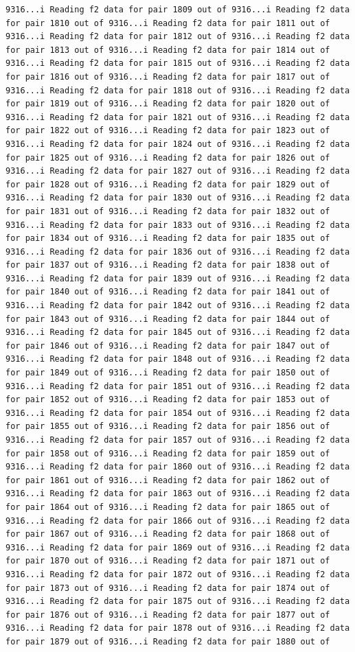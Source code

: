 \documentclass[
]{article}
\begin{document}
\begin{verbatim}
9316...i Reading f2 data for pair 1809 out of 9316...i Reading f2 data for pair 1810 out of 9316...i Reading f2 data for pair 1811 out of 9316...i Reading f2 data for pair 1812 out of 9316...i Reading f2 data for pair 1813 out of 9316...i Reading f2 data for pair 1814 out of 9316...i Reading f2 data for pair 1815 out of 9316...i Reading f2 data for pair 1816 out of 9316...i Reading f2 data for pair 1817 out of 9316...i Reading f2 data for pair 1818 out of 9316...i Reading f2 data for pair 1819 out of 9316...i Reading f2 data for pair 1820 out of 9316...i Reading f2 data for pair 1821 out of 9316...i Reading f2 data for pair 1822 out of 9316...i Reading f2 data for pair 1823 out of 9316...i Reading f2 data for pair 1824 out of 9316...i Reading f2 data for pair 1825 out of 9316...i Reading f2 data for pair 1826 out of 9316...i Reading f2 data for pair 1827 out of 9316...i Reading f2 data for pair 1828 out of 9316...i Reading f2 data for pair 1829 out of 9316...i Reading f2 data for pair 1830 out of 9316...i Reading f2 data for pair 1831 out of 9316...i Reading f2 data for pair 1832 out of 9316...i Reading f2 data for pair 1833 out of 9316...i Reading f2 data for pair 1834 out of 9316...i Reading f2 data for pair 1835 out of 9316...i Reading f2 data for pair 1836 out of 9316...i Reading f2 data for pair 1837 out of 9316...i Reading f2 data for pair 1838 out of 9316...i Reading f2 data for pair 1839 out of 9316...i Reading f2 data for pair 1840 out of 9316...i Reading f2 data for pair 1841 out of 9316...i Reading f2 data for pair 1842 out of 9316...i Reading f2 data for pair 1843 out of 9316...i Reading f2 data for pair 1844 out of 9316...i Reading f2 data for pair 1845 out of 9316...i Reading f2 data for pair 1846 out of 9316...i Reading f2 data for pair 1847 out of 9316...i Reading f2 data for pair 1848 out of 9316...i Reading f2 data for pair 1849 out of 9316...i Reading f2 data for pair 1850 out of 9316...i Reading f2 data for pair 1851 out of 9316...i Reading f2 data for pair 1852 out of 9316...i Reading f2 data for pair 1853 out of 9316...i Reading f2 data for pair 1854 out of 9316...i Reading f2 data for pair 1855 out of 9316...i Reading f2 data for pair 1856 out of 9316...i Reading f2 data for pair 1857 out of 9316...i Reading f2 data for pair 1858 out of 9316...i Reading f2 data for pair 1859 out of 9316...i Reading f2 data for pair 1860 out of 9316...i Reading f2 data for pair 1861 out of 9316...i Reading f2 data for pair 1862 out of 9316...i Reading f2 data for pair 1863 out of 9316...i Reading f2 data for pair 1864 out of 9316...i Reading f2 data for pair 1865 out of 9316...i Reading f2 data for pair 1866 out of 9316...i Reading f2 data for pair 1867 out of 9316...i Reading f2 data for pair 1868 out of 9316...i Reading f2 data for pair 1869 out of 9316...i Reading f2 data for pair 1870 out of 9316...i Reading f2 data for pair 1871 out of 9316...i Reading f2 data for pair 1872 out of 9316...i Reading f2 data for pair 1873 out of 9316...i Reading f2 data for pair 1874 out of 9316...i Reading f2 data for pair 1875 out of 9316...i Reading f2 data for pair 1876 out of 9316...i Reading f2 data for pair 1877 out of 9316...i Reading f2 data for pair 1878 out of 9316...i Reading f2 data for pair 1879 out of 9316...i Reading f2 data for pair 1880 out of 
\end{verbatim}
\end{document}
